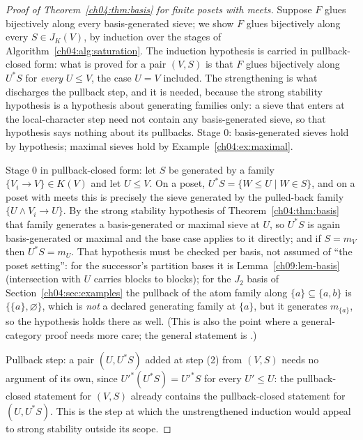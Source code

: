 \begin{proof}[Proof of Theorem~\ref{ch04:thm:basis} for finite posets with meets]
Suppose $F$ glues bijectively along every basis-generated sieve; we show $F$
glues bijectively along every $S\in J_K(V)$, by induction over the stages of
Algorithm~\ref{ch04:alg:saturation}. The induction hypothesis is carried in
pullback-closed form: what is proved for a pair $(V,S)$ is that $F$ glues
bijectively along $U^{*}S$ for \emph{every} $U\le V$, the case $U=V$
included. The strengthening is what discharges the pullback step, and it is
needed, because the strong stability hypothesis is a hypothesis about
generating families only: a sieve that enters at the local-character step
need not contain any basis-generated sieve, so that hypothesis says nothing
about its pullbacks. Stage $0$: basis-generated sieves hold by hypothesis;
maximal sieves hold by Example~\ref{ch04:ex:maximal}.

Stage $0$ in pullback-closed form: let $S$ be generated by a family
$\{V_{i}\to V\}\in K(V)$ and let $U\le V$. On a poset,
$U^{*}S=\{W\le U\mid W\in S\}$, and on a poset with meets this is precisely
the sieve generated by the pulled-back family $\{U\wedge V_{i}\to U\}$. By
the strong stability hypothesis of Theorem~\ref{ch04:thm:basis} that family
generates a basis-generated or maximal sieve at $U$, so $U^{*}S$ is again
basis-generated or maximal and the base case applies to it directly; and if
$S=m_{V}$ then $U^{*}S=m_{U}$.
That hypothesis must be checked per basis, not assumed of ``the poset
setting'': for the successor's partition bases it is
Lemma~\ref{ch09:lem-basis} (intersection with $U$ carries blocks to blocks);
for the $J_2$ basis of Section~\ref{ch04:sec:examples} the pullback of the
atom family along $\{a\}\subseteq\{a,b\}$ is $\{\{a\},\varnothing\}$, which
is \emph{not} a declared generating family at $\{a\}$, but it generates
$m_{\{a\}}$, so the hypothesis holds there as well. (This is also the point
where a general-category proof needs more care; the general statement is
\cite{stacks00ZC}.)

Pullback step: a pair $(U,U^{*}S)$ added at step (2) from $(V,S)$ needs no
argument of its own, since $U'^{*}(U^{*}S)=U'^{*}S$ for every $U'\le U$: the
pullback-closed statement for $(V,S)$ already contains the pullback-closed
statement for $(U,U^{*}S)$. This is the step at which the unstrengthened
induction would appeal to strong stability outside its scope.


\end{proof}
